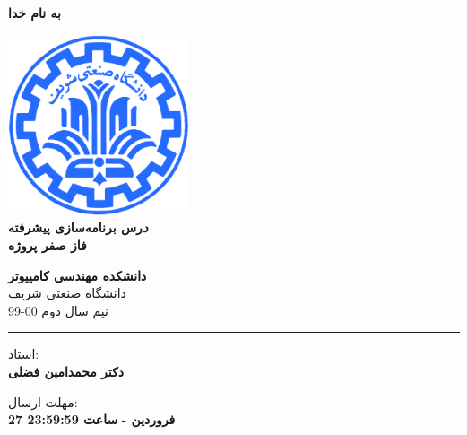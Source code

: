 \documentclass[]{article}
\begin{document}
\begin{titlepage}
\begin{center}

\textbf{ \Huge{به نام خدا} }
        
\vspace{0.2cm}

\includegraphics[width=0.4\textwidth]{sharif1.png}\\
\vspace{0.2cm}
\textbf{ \Huge{\emph درس برنامه‌سازی پیشرفته} }\\
\vspace{0.25cm}
\textbf{ \Large{ فاز صفر پروژه} }
\vspace{0.2cm}
       
 
      \large \textbf{دانشکده مهندسی کامپیوتر}\\\vspace{0.1cm}
    \large   دانشگاه صنعتی شریف\\\vspace{0.2cm}
       \large   ﻧﯿﻢ سال دوم 00-99 \\\vspace{0.10cm}
      \noindent\rule[1ex]{\linewidth}{1pt}
استاد:\\
    \textbf{{دکتر محمدامین فضلی}}



    \vspace{0.20cm}

   مهلت ارسال:\\
    \textbf{{27 فروردین - }}
    \textbf{{ساعت 23:59:59}}

    \vspace{0.10cm}



\end{center}
\end{titlepage}


\newpage
\pagestyle{fancy}
\fancyhf{}
\fancyfoot{}
\cfoot{\thepage}
\renewcommand{\headrulewidth}{2pt}
\end{document}
